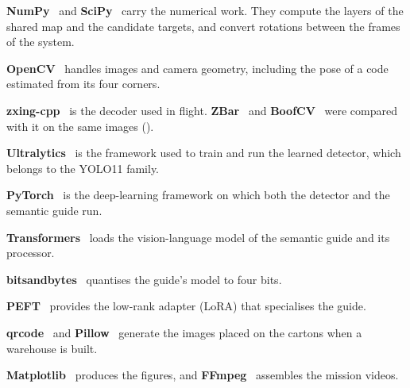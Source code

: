 \textbf{NumPy}~ and
\textbf{SciPy}~ carry the numerical work. They
compute the layers of the shared map and the candidate targets, and convert
rotations between the frames of the system.

\textbf{OpenCV}~ handles images and camera
geometry, including the pose of a code estimated from its four corners.

\textbf{zxing-cpp}~ is the
 decoder used in flight.
\textbf{ZBar}~ and
\textbf{BoofCV}~ were compared with it on the
same images ().

\textbf{Ultralytics}~ is the framework
used to train and run the learned detector, which belongs to the YOLO11 family.

\textbf{PyTorch}~ is the deep-learning
framework on which both the detector and the semantic guide run.

\textbf{Transformers}~
loads the vision-language model of the semantic guide and its processor.

\textbf{bitsandbytes}~
quantises the guide's model to four bits.

\textbf{PEFT}~ provides the
low-rank adapter (LoRA) that specialises the guide.

\textbf{qrcode}~ and
\textbf{Pillow}~ generate the
 images placed on the cartons when a warehouse is built.

\textbf{Matplotlib}~ produces the figures,
and \textbf{FFmpeg}~ assembles the mission
videos.
